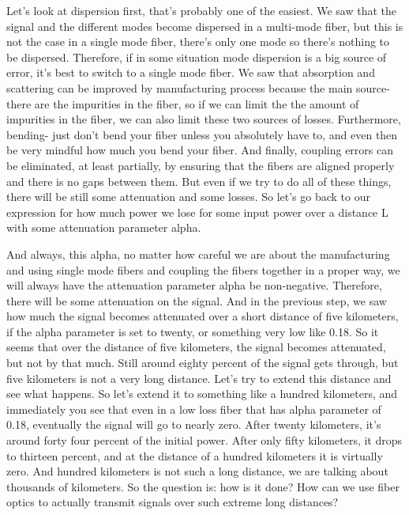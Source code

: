 Let's look at dispersion first, that's probably one of the easiest. We saw that the signal and the different modes become dispersed in a multi-mode fiber, but this is not the case in a single mode fiber, there's only one mode so there's nothing to be dispersed. Therefore, if in some situation mode dispersion is a big source of error, it's best to switch to a single mode fiber. We saw that absorption and scattering can be improved by manufacturing process because the main source- there are the impurities in the fiber, so if we can limit the the amount of impurities in the fiber, we can also limit these two sources of losses. Furthermore, bending- just don't bend your fiber unless you absolutely have to, and even then be very mindful how much you bend your fiber. And finally, coupling errors can be eliminated, at least partially, by ensuring that the fibers are aligned properly and there is no gaps between them. But even if we try to do all of these things, there will be still some attenuation and some losses. So let's go back to our expression for how much power we lose for some input power over a distance L with some attenuation parameter alpha.

And always, this alpha, no matter how careful we are about the manufacturing and using single mode fibers and coupling the fibers together in a proper way, we will always have the attenuation parameter alpha be non-negative. Therefore, there will be some attenuation on the signal. And in the previous step, we saw how much the signal becomes attenuated over a short distance of five kilometers, if the alpha parameter is set to twenty, or something very low like 0.18. So it seems that over the distance of five kilometers, the signal becomes attenuated, but not by that much. Still around eighty percent of the signal gets through, but five kilometers is not a very long distance. Let's try to extend this distance and see what happens. So let's extend it to something like a hundred kilometers, and immediately you see that even in a low loss fiber that has alpha parameter of 0.18, eventually the signal will go to nearly zero. After twenty kilometers, it's around forty four percent of the initial power. After only fifty kilometers, it drops to thirteen percent, and at the distance of a hundred kilometers it is virtually zero. And hundred kilometers is not such a long distance, we are talking about thousands of kilometers. So the question is: how is it done? How can we use fiber optics to actually transmit signals over such extreme long distances?

